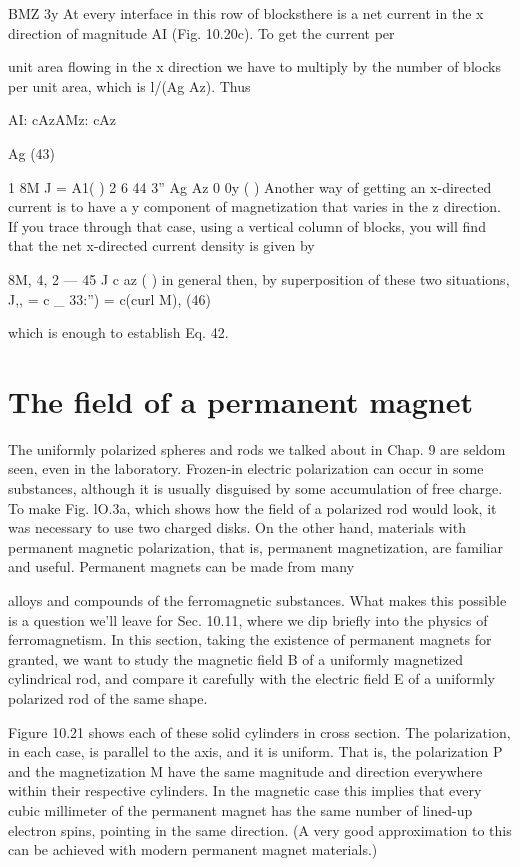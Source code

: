 {{BMZ
3y
At every interface in this row of blocksthere is a net current in the
x direction of magnitude AI (Fig. 10.20c). To get the current per

unit area flowing in the x direction we have to multiply by the number
of blocks per unit area, which is l/(Ag Az). Thus

AI: cAzAMz: cAz

Ag (43)

1 8M
J = A1( ) 2 6 44
3'' Ag Az 0 0y ( )
Another way of getting an x-directed current is to have a y component
of magnetization that varies in the z direction. If you trace
through that case, using a vertical column of blocks, you will find
that the net x-directed current density is given by

8M,
4, 2  ---  45
J c az ( )
in general then, by superposition of these two situations,
J,, = c  _ 33:'') = c(curl M), (46)

which is enough to establish Eq. 42.

\section{The field of a permanent magnet}

The uniformly polarized spheres and rods we talked about in
Chap. 9 are seldom seen, even in the laboratory. Frozen-in electric
polarization can occur in some substances, although it is usually
disguised by some accumulation of free charge. To make Fig. lO.3a,
which shows how the field of a polarized rod would look, it was necessary
to use two charged disks. On the other hand, materials with
permanent magnetic polarization, that is, permanent magnetization,
are familiar and useful. Permanent magnets can be made from many

alloys and compounds of the ferromagnetic substances. What
makes this possible is a question we'll leave for Sec. 10.11, where we
dip briefly into the physics of ferromagnetism. In this section, taking
the existence of permanent magnets for granted, we want to study
the magnetic field B of a uniformly magnetized cylindrical rod, and
compare it carefully with the electric field E of a uniformly polarized
rod of the same shape.

Figure 10.21 shows each of these solid cylinders in cross section.
The polarization, in each case, is parallel to the axis, and it is 
uniform. That is, the polarization P and the magnetization M have the
same magnitude and direction everywhere within their respective
cylinders. In the magnetic case this implies that every cubic millimeter
of the permanent magnet has the same number of lined-up
electron spins, pointing in the same direction. (A very good approximation
to this can be achieved with modern permanent magnet
materials.)

}}
